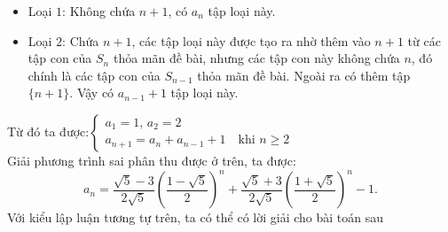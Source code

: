 \begin{bt}
{		\begin{itemize}
			\item Loại $ 1 $: Không chứa $ n+1 $, có  $a_n$ tập loại này.
			\item Loại $ 2 $: Chứa $ n+1 $, các tập loại này được tạo ra nhờ thêm vào $  n+1 $ từ các tập con của $S_n$ thỏa mãn đề bài, nhưng các tập con này không chứa $ n $, đó chính là các tập con của $S_{n-1}$  thỏa mãn đề bài. Ngoài ra có thêm tập $ \{n+1\} $. Vậy có  $a_{n-1}+1$ tập loại này.
		\end{itemize}
		Từ đó ta được:$ \left\{\begin{array}{l}
		a_1=1,\,a_2=2\\ a_{n+1}=a_n+a_{n-1}  +1 \quad \text {khi } n\geq2
		\end{array}\right.$\\
		Giải phương trình sai phân thu được ở trên, ta được: 
		$$a_n=\dfrac{\sqrt{5}-3}{2\sqrt{5}}\left(\dfrac{1-\sqrt{5}}{2}\right)^n+\dfrac{\sqrt{5}+3}{2\sqrt{5}}\left(\dfrac{1+\sqrt{5}}{2}\right)^n-1.$$
		Với kiểu lập luận tương tự trên, ta có thể có lời giải cho bài toán sau}
\end{bt}
